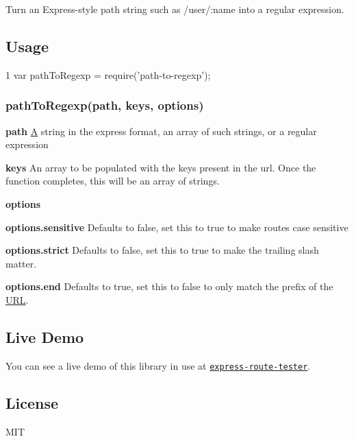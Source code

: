 Turn an Express-\/style path string such as {\ttfamily /user/\+:name} into a regular expression.

\subsection*{Usage}


\begin{DoxyCode}
1 var pathToRegexp = require('path-to-regexp');
\end{DoxyCode}
 \subsubsection*{path\+To\+Regexp(path, keys, options)}


\begin{DoxyItemize}
\item {\bfseries path} \hyperlink{class_a}{A} string in the express format, an array of such strings, or a regular expression
\item {\bfseries keys} An array to be populated with the keys present in the url. Once the function completes, this will be an array of strings.
\item {\bfseries options}
\begin{DoxyItemize}
\item {\bfseries options.\+sensitive} Defaults to false, set this to true to make routes case sensitive
\item {\bfseries options.\+strict} Defaults to false, set this to true to make the trailing slash matter.
\item {\bfseries options.\+end} Defaults to true, set this to false to only match the prefix of the \hyperlink{struct_u_r_l}{U\+R\+L}.
\end{DoxyItemize}
\end{DoxyItemize}




\subsection*{Live Demo}

You can see a live demo of this library in use at \href{http://forbeslindesay.github.com/express-route-tester/}{\tt express-\/route-\/tester}.

\subsection*{License}

M\+I\+T 